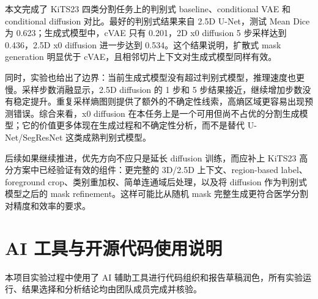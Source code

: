 \documentclass[lang=cn,11pt,a4paper]{elegantpaper}
\begin{document}
本文完成了 KiTS23 四类分割任务上的判别式 baseline、conditional VAE 和 conditional diffusion 对比。最好的判别式结果来自 2.5D U-Net，测试 Mean Dice 为 0.623；生成式模型中，cVAE 只有 0.201，2D x0 diffusion 5 步采样达到 0.436，2.5D x0 diffusion 进一步达到 0.534。这个结果说明，扩散式 mask generation 明显优于 cVAE，且相邻切片上下文对生成式模型同样有效。

同时，实验也给出了边界：当前生成式模型没有超过判别式模型，推理速度也更慢。采样步数消融显示，2.5D diffusion 的 1 步和 5 步结果接近，继续增加步数没有稳定提升。重复采样熵图则提供了额外的不确定性线索，高熵区域更容易出现预测错误。综合来看，x0 diffusion 在本任务上是一个可用但尚不占优的分割生成模型；它的价值更多体现在生成过程和不确定性分析，而不是替代 U-Net/SegResNet 这类成熟判别式模型。

后续如果继续推进，优先方向不应只是延长 diffusion 训练，而应补上 KiTS23 高分方案中已经验证有效的组件：更完整的 3D/2.5D 上下文、region-based label、foreground crop、类别重加权、简单连通域后处理，以及将 diffusion 作为判别式模型之后的 mask refinement。这样可能比从随机 mask 完整生成更符合医学分割对精度和效率的要求。

\printbibliography[title={参考文献}]

\section{AI 工具与开源代码使用说明}

本项目实验过程中使用了 AI 辅助工具进行代码组织和报告草稿润色，所有实验运行、结果选择和分析结论均由团队成员完成并核验。
\end{document}
